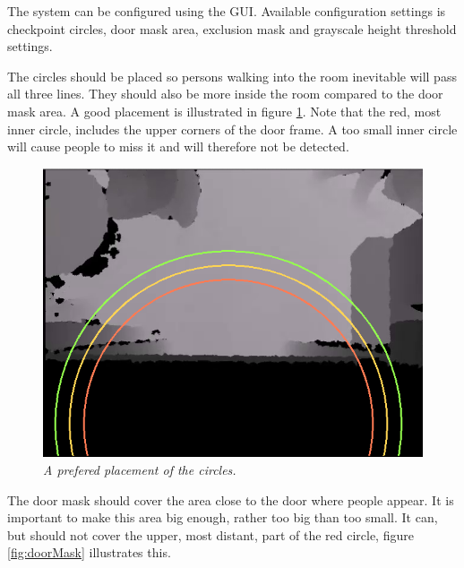 The system can be configured using the GUI. Available configuration settings is checkpoint circles, door mask area, exclusion mask and grayscale height threshold settings. 

The circles should be placed so persons walking into the room inevitable will pass all three lines. They should also be more inside the room compared to the door mask area. A good placement is illustrated in figure \ref{fig:circlePlacement}. Note that the red, most inner circle, includes the upper corners of the door frame. A too small inner circle will cause people to miss it and will therefore not be detected. 

\begin{figure}[H]
	\centering
	\includegraphics[width=\linewidth]{images/Manual2.png}
	\caption[Circle placment]{\textit{A prefered placement of the circles. }}
	\label{fig:circlePlacement}  %
\end{figure}

\newpage
The door mask should cover the area close to the door where people appear. It is important to make this area big enough, rather too big than too small. It can, but should not cover the upper, most distant, part of the red circle, figure \ref{fig:doorMask} illustrates this.

